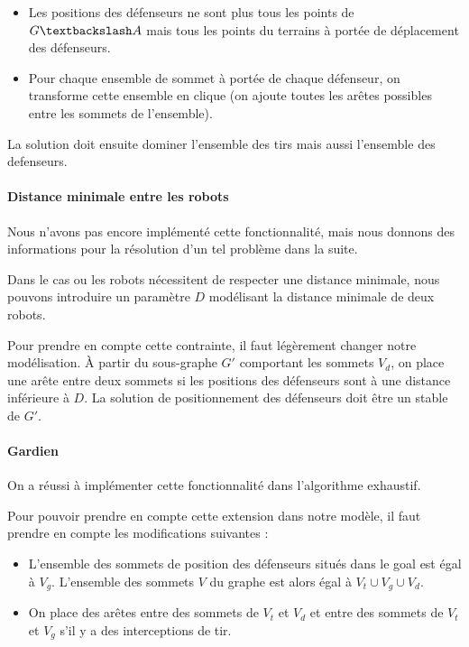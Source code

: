 \documentclass[12pt]{article}
\begin{document}
\begin{itemize}
  \item Les positions des défenseurs ne sont plus tous les points de $G \textbackslash A$ mais tous les points du terrains à portée de déplacement des défenseurs.
  \item Pour chaque ensemble de sommet à portée de chaque défenseur, on transforme cette ensemble en clique (on ajoute toutes les arêtes possibles entre les sommets de l'ensemble).
\end{itemize}

La solution doit ensuite dominer l'ensemble des tirs mais aussi l'ensemble des defenseurs.

\paragraph{Distance minimale entre les robots} Nous n'avons pas encore implémenté cette fonctionnalité, mais nous donnons des informations pour la résolution d'un tel problème dans la suite.

Dans le cas ou les robots nécessitent de respecter une distance minimale, nous pouvons introduire un paramètre $D$ modélisant la distance minimale de deux robots.

Pour prendre en compte cette contrainte, il faut légèrement changer notre modélisation. À partir du sous-graphe $G'$ comportant les sommets $V_d$, on place une arête entre deux sommets si les positions des défenseurs sont à une distance inférieure à $D$. La solution de positionnement des défenseurs doit être un stable de $G'$.


\paragraph{Gardien}
On a réussi à implémenter cette fonctionnalité dans l'algorithme exhaustif.

Pour pouvoir prendre en compte cette extension dans notre modèle, il faut prendre en compte les modifications suivantes :
\begin{itemize}
  \item L'ensemble des sommets de position des défenseurs situés dans le goal est égal à $V_g$. L'ensemble des sommets $V$ du graphe est alors égal à $V_t \cup V_g \cup V_d$.
  \item On place des arêtes entre des sommets de $V_t$ et $V_d$ et entre des sommets de $V_t$ et $V_g$ s'il y a des interceptions de tir.
\end{itemize}
\end{document}
